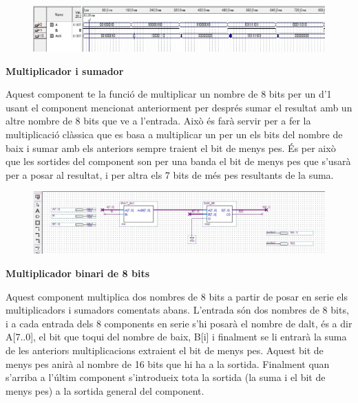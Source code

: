 \documentclass[12pt, a4papre]{article}
\begin{document}
	\begin{center}
	
	\begin{figure}[H]
		\begin{center}
		\includegraphics[width=150mm]{MULT8x1simul.jpeg}
		\end{center}
	\end{figure}
	
	\end{center}
	
	\textbf{\large{Multiplicador i sumador}}
	
	Aquest component te la funció de multiplicar un nombre de 8 bits per un d'1 usant el component mencionat anteriorment per després sumar el resultat amb un altre nombre de 8 bits que ve a l'entrada. Això és farà servir per a fer la multiplicació clàssica que es basa a multiplicar un per un els bits del nombre de baix i sumar amb els anteriors sempre traient el bit de menys pes. És per això que les sortides del component son per una banda el bit de menys pes que s'usarà per a posar al resultat, i per altra els 7 bits de més pes resultants de la suma.
	
	\begin{center}
	\begin{figure}[H]
		\begin{center}
		\includegraphics[width=150mm]{MULT_+SUM.jpeg}
		\end{center}
	\end{figure}
	
	\end{center}
	
	
	\textbf{\large{Multiplicador binari de 8 bits}}
	
	Aquest component multiplica dos nombres de 8 bits a partir de posar en serie els multiplicadors i sumadors comentats abans. L'entrada són dos nombres de 8 bits, i a cada entrada dels 8 components en serie s'hi posarà el nombre de dalt, és a dir A[7..0], el bit que toqui del nombre de baix, B[i] i finalment se li entrarà la suma de les anteriors multiplicacions extraient el bit de menys pes. Aquest bit de menys pes anirà al nombre de 16 bits que hi ha a la sortida. Finalment quan s'arriba a l'últim component s'introdueix tota la sortida (la suma i el bit de menys pes) a la sortida general del component.
	
\end{document}
